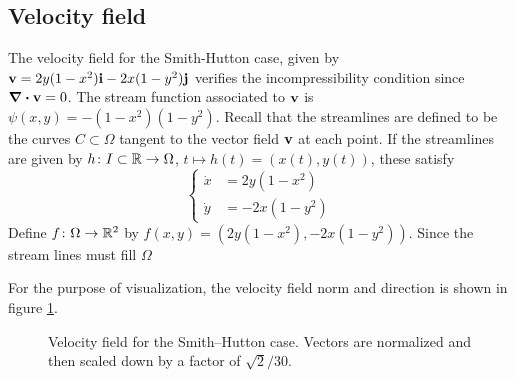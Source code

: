 
\subsection{Velocity field}

The velocity field for the Smith-Hutton case, given by $\vb{v} = 2 y (1 - x^2) \vb{i} - 2 x (1 - y^2) \vb{j}$ verifies the incompressibility condition since $\div{\vb{v}} = 0$. The stream function associated to $\vb{v}$ is $\psi(x,y) = -(1-x^2)(1-y^2)$. Recall that the streamlines are defined to be the curves $C \subset \Omega$ tangent to the vector field $\vb{v}$ at each point. If the streamlines are given by $h \colon I \subset \mathbb{R} \to \Omega$, $t \mapsto h(t) = (x(t), y(t))$, these satisfy
\begin{equation}
	\left\{
	\begin{aligned}
		\dot{x} &= 2 y (1 - x^2) \\
		\dot{y} &= - 2 x (1 - y^2)
	\end{aligned}
	\right.
\end{equation}
Define $f \colon \Omega \rightarrow \mathbb{R}^2$ by $f(x,y) = (2y(1 - x^2), -2x(1 - y^2))$. Since the stream lines must fill $\Omega$


For the purpose of visualization, the velocity field norm and direction is shown in figure \ref{fig:smith_hutton_velocity_field}.
\begin{figure}[h]
	\centering
	
	\captionsetup{width=0.75\textwidth}
	\caption{Velocity field for the Smith--Hutton case. Vectors are normalized and then scaled down by a factor of $\sqrt{2}/30$.}
	\label{fig:smith_hutton_velocity_field}
\end{figure}